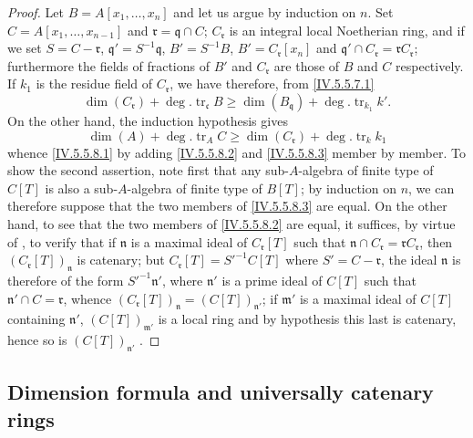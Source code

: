 \begin{proof}
Let $B=A[x_1,\ldots,x_n]$ and let us argue by induction on $n$.
Set $C=A[x_1,\ldots,x_{n-1}]$ and $\mathfrak{r}=\mathfrak{q}\cap C$; $C_\mathfrak{r}$ is an integral local Noetherian ring, and if we set $S=C-\mathfrak{r}$, $\mathfrak{q}'=S^{-1}\mathfrak{q}$, $B'=S^{-1}B$, $B'=C_\mathfrak{r}[x_n]$ and $\mathfrak{q}'\cap C_\mathfrak{r}=\mathfrak{r}C_\mathfrak{r}$; furthermore the fields of fractions of $B'$ and $C_\mathfrak{r}$ are those of $B$ and $C$ respectively.
If $k_1$ is the residue field of $C_\mathfrak{r}$, we have therefore, from \eqref{IV.5.5.7.1}
\[
\tag{5.5.8.2}\label{IV.5.5.8.2}
  \dim(C_\mathfrak{r}) + \deg.\operatorname{tr}_\mathfrak{c} B \geq \dim(B_\mathfrak{q}) + \deg.\operatorname{tr}_{k_1} k'.
\]
On the other hand, the induction hypothesis gives
\[
\tag{5.5.8.3}\label{IV.5.5.8.3}
  \dim(A) + \deg.\operatorname{tr}_A C \geq \dim(C_\mathfrak{r}) + \deg.\operatorname{tr}_k k_1
\]
whence \eqref{IV.5.5.8.1} by adding \eqref{IV.5.5.8.2} and \eqref{IV.5.5.8.3} member by member.
To show the second assertion, note first that any sub-$A$-algebra of finite type of $C[T]$ is also a sub-$A$-algebra of finite type of $B[T]$; by induction on $n$, we can therefore suppose that the two members of \eqref{IV.5.5.8.3} are equal.
On the other hand, to see that the two members of \eqref{IV.5.5.8.2} are equal, it suffices, by virtue of , to verify that if $\mathfrak{n}$ is a maximal ideal of $C_\mathfrak{r}[T]$ such that $\mathfrak{n}\cap C_\mathfrak{r}=\mathfrak{r}C_\mathfrak{r}$, then $(C_\mathfrak{r}[T])_\mathfrak{n}$ is catenary; but $C_\mathfrak{r}[T]=S'^{-1}C[T]$ where $S'=C-\mathfrak{r}$, the ideal $\mathfrak{n}$ is therefore of the form $S'^{-1}\mathfrak{n}'$, where $\mathfrak{n}'$ is a prime ideal of $C[T]$ such that $\mathfrak{n}'\cap C=\mathfrak{r}$, whence $(C_\mathfrak{r}[T])_\mathfrak{n}=(C[T])_{\mathfrak{n}'}$; if $\mathfrak{m}'$ is a maximal ideal of $C[T]$ containing $\mathfrak{n}'$, $(C[T])_{\mathfrak{m}'}$ is a local ring and by hypothesis this last is catenary, hence so is $(C[T])_{\mathfrak{n}'}$ .
\end{proof}

\subsection{Dimension formula and universally catenary rings}
\label{subsection:IV.5.6}


